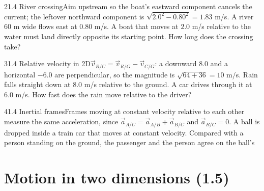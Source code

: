 \documentclass[11pt]{article}
\begin{document}
\begin{q}{2}{1.4 River crossing}{Aim upstream so the boat's eastward component cancels the current; the leftover northward component is $\sqrt{2.0^2 - 0.80^2} = 1.83$ m/s.}
A river $60$ m wide flows east at $0.80$ m/s. A boat that moves at $2.0$ m/s relative to the water must land directly opposite its starting point. How long does the crossing take?
\end{q}
\begin{q}{3}{1.4 Relative velocity in 2D}{$\vec v_{R/C} = \vec v_{R/G} - \vec v_{C/G}$: a downward 8.0 and a horizontal $-6.0$ are perpendicular, so the magnitude is $\sqrt{64 + 36} = 10$ m/s.}
Rain falls straight down at $8.0$ m/s relative to the ground. A car drives through it at $6.0$ m/s. How fast does the rain move relative to the driver?
\end{q}
\begin{q}{4}{1.4 Inertial frames}{Frames moving at constant velocity relative to each other measure the same acceleration, since $\vec a_{A/C} = \vec a_{A/B} + \vec a_{B/C}$ and $\vec a_{B/C} = 0$.}
A ball is dropped inside a train car that moves at constant velocity. Compared with a person standing on the ground, the passenger and the person agree on the ball's
\end{q}

\section{Motion in two dimensions (1.5)}
\end{document}

